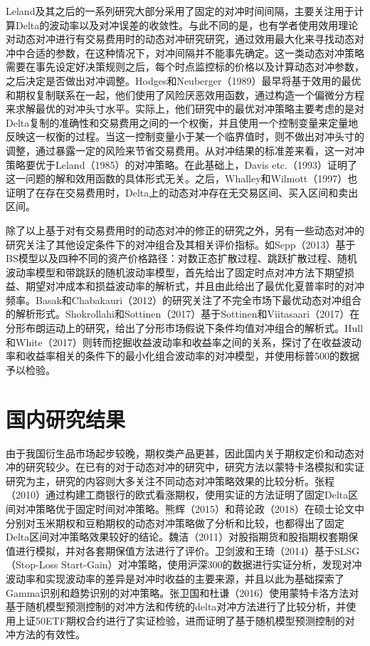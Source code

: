 Leland及其之后的一系列研究大部分采用了固定的对冲时间间隔，主要关注用于计算Delta的波动率以及对冲误差的收敛性。与此不同的是，也有学者使用效用理论对动态对冲进行有交易费用时的动态对冲研究研究，通过效用最大化来寻找动态对冲中合适的参数，在这种情况下，对冲间隔并不能事先确定。这一类动态对冲策略需要在事先设定好决策规则之后，每个时点监控标的价格以及计算动态对冲参数，之后决定是否做出对冲调整。Hodges和Neuberger（1989）最早将基于效用的最优和期权复制联系在一起，他们使用了风险厌恶效用函数，通过构造一个偏微分方程来求解最优的对冲头寸水平。实际上，他们研究中的最优对冲策略主要考虑的是对Delta复制的准确性和交易费用之间的一个权衡，并且使用一个控制变量来定量地反映这一权衡的过程。当这一控制变量小于某一个临界值时，则不做出对冲头寸的调整，通过暴露一定的风险来节省交易费用。从对冲结果的标准差来看，这一对冲策略要优于Leland（1985）的对冲策略。在此基础上，Davis etc.（1993）证明了这一问题的解和效用函数的具体形式无关。之后，Whalley和Wilmott（1997）也证明了在存在交易费用时，Delta上的动态对冲存在无交易区间、买入区间和卖出区间。

除了以上基于对有交易费用时的动态对冲的修正的研究之外，另有一些动态对冲的研究关注了其他设定条件下的对冲组合及其相关评价指标。如Sepp（2013）基于BS模型以及四种不同的资产价格路径：对数正态扩散过程、跳跃扩散过程、随机波动率模型和带跳跃的随机波动率模型，首先给出了固定时点对冲方法下期望损益、期望对冲成本和损益波动率的解析式，并且由此给出了最优化夏普率时的对冲频率。Basak和Chabakauri（2012）的研究关注了不完全市场下最优动态对冲组合的解析形式。Shokrollahi和Sottinen（2017）基于Sottinen和Viitasaari（2017）在分形布朗运动上的研究，给出了分形市场假说下条件均值对冲组合的解析式。Hull和White（2017）则转而挖掘收益波动率和收益率之间的关系，探讨了在收益波动率和收益率相关的条件下的最小化组合波动率的对冲模型，并使用标普500的数据予以检验。

\section{国内研究结果}

由于我国衍生品市场起步较晚，期权类产品更甚，因此国内关于期权定价和动态对冲的研究较少。在已有的对于动态对冲的研究中，研究方法以蒙特卡洛模拟和实证研究为主，研究的内容则大多关注不同动态对冲策略效果的比较分析。张程（2010）通过构建工商银行的欧式看涨期权，使用实证的方法证明了固定Delta区间对冲策略优于固定时间对冲策略。熊辉（2015）和蒋论政（2018）在硕士论文中分别对玉米期权和豆粕期权的动态对冲策略做了分析和比较，也都得出了固定Delta区间对冲策略效果较好的结论。魏洁（2011）对股指期货和股指期权套期保值进行模拟，并对各套期保值方法进行了评价。卫剑波和王琦（2014）基于SLSG（Stop-Loss Start-Gain）对冲策略，使用沪深300的数据进行实证分析，发现对冲波动率和实现波动率的差异是对冲时收益的主要来源，并且以此为基础探索了Gamma识别和趋势识别的对冲策略。张卫国和杜谦（2016）使用蒙特卡洛方法对基于随机模型预测控制的对冲方法和传统的delta对冲方法进行了比较分析，并使用上证50ETF期权合约进行了实证检验，进而证明了基于随机模型预测控制的对冲方法的有效性。

